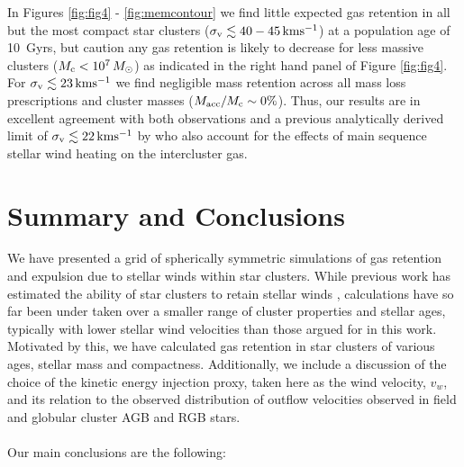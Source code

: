 \documentclass[fleqn,usenatbib]{mnras}
\begin{document}
 In Figures \ref{fig:fig4} - \ref{fig:memcontour} we find little expected gas retention in all but the most compact star clusters ($\sigma_{\rm v} \lesssim 40-45 \, {\rm km s^{-1}}$) at a population age of 10~Gyrs, but caution any gas retention is likely to decrease for less massive clusters ($M_{\rm c} < 10^7 \, M_\odot$) as indicated in the right hand panel of Figure \ref{fig:fig4}.  For $\sigma_{\rm v} \lesssim 23 \, {\rm km s^{-1}}$ we find negligible mass retention across all mass loss prescriptions and cluster masses ($M_{\rm acc}/M_{\rm c} \sim 0\%$).  
 Thus, our results are in excellent agreement with both observations and a previous analytically derived limit of $\sigma_{\rm v} \lesssim 22 \, {\rm km s^{-1}}$ by \cite{smith1999} who also account for the effects of main sequence stellar wind heating on the intercluster gas.










\section{Summary and Conclusions} \label{section:conclusions}

 We have presented a grid of spherically symmetric simulations of gas retention and expulsion due to stellar winds within star clusters.
 While previous work has estimated the ability of star clusters to retain stellar winds \citep{dercole2008,dercole2010,vesperini2010,conroy2011b,conroy2011a}, calculations have so far been under taken over a smaller range of cluster properties and stellar ages, typically with lower stellar wind velocities than those argued for in this work.
 Motivated by this, we have calculated gas retention in  star clusters of various ages, stellar mass and compactness.  
 Additionally, we include a discussion of the choice of the kinetic energy injection proxy, taken here as the wind velocity, $v_w$, and its relation to the observed distribution of outflow velocities observed in field and globular cluster AGB and RGB stars.  \\
 \\
\noindent Our main conclusions are the following:
\end{document}

